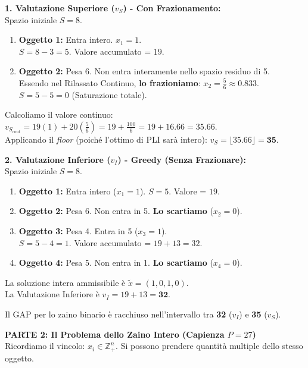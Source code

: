 \documentclass[12pt, a4paper]{article}
\newcommand{\separatore}{\noindent{\color{titlecolor!50}\rule{\textwidth}{0.6pt}}}
\begin{document}
	\textbf{1. Valutazione Superiore ($v_S$) - Con Frazionamento:}\\
	Spazio iniziale $S = 8$.
	\begin{enumerate}
		\item \textbf{Oggetto 1:} Entra intero. $x_1=1$. \\
		$S = 8 - 3 = 5$. Valore accumulato = $19$.
		\item \textbf{Oggetto 2:} Pesa 6. Non entra interamente nello spazio residuo di 5. \\
		Essendo nel Rilassato Continuo, \textbf{lo frazioniamo}: $x_2 = \frac{5}{6} \approx 0.833$. \\
		$S = 5 - 5 = 0$ (Saturazione totale).
	\end{enumerate}
	Calcoliamo il valore continuo: 
	$v_{S_{cont}} = 19(1) + 20\left(\frac{5}{6}\right) = 19 + \frac{100}{6} = 19 + 16.66 = \mathbf{35.66}$.\\
	Applicando il \textit{floor} (poiché l'ottimo di PLI sarà intero): $v_S = \lfloor 35.66 \rfloor = \mathbf{35}$.
	
	\textbf{2. Valutazione Inferiore ($v_I$) - Greedy (Senza Frazionare):}\\
	Spazio iniziale $S = 8$.
	\begin{enumerate}
		\item \textbf{Oggetto 1:} Entra intero ($x_1=1$). $S = 5$. Valore = $19$.
		\item \textbf{Oggetto 2:} Pesa 6. Non entra in 5. \textbf{Lo scartiamo} ($x_2=0$).
		\item \textbf{Oggetto 3:} Pesa 4. Entra in 5 ($x_3=1$). \\
		$S = 5 - 4 = 1$. Valore accumulato = $19 + 13 = 32$.
		\item \textbf{Oggetto 4:} Pesa 5. Non entra in 1. \textbf{Lo scartiamo} ($x_4=0$).
	\end{enumerate}
	La soluzione intera ammissibile è $\tilde{x} = (1, 0, 1, 0)$. \\
	La Valutazione Inferiore è $v_I = 19 + 13 = \mathbf{32}$.
	
	Il GAP per lo zaino binario è racchiuso nell'intervallo tra \textbf{32} ($v_I$) e \textbf{35} ($v_S$).
	
	\vspace{0.6cm}
	\separatore
	\vspace{0.4cm}
	
	\textbf{PARTE 2: Il Problema dello Zaino Intero (Capienza $P = 27$)}\\
	Ricordiamo il vincolo: $x_i \in \mathbb{Z}^n_+$. Si possono prendere quantità multiple dello stesso oggetto.
	
\end{document}
